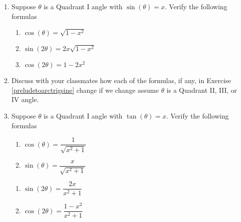 \documentclass{ximera}
\begin{document}
\begin{enumerate}

\setcounter{enumi}{\value{HW}}

\item  \label{preludetoarctrigsine} Suppose $\theta$ is a Quadrant I angle with $\sin(\theta) = x$. Verify the following formulas

\begin{multicols}{3}

\begin{enumerate}

\item  $\cos(\theta) = \sqrt{1-x^2}$

\item  $\sin(2\theta) = 2x\sqrt{1-x^2}$

\item $\cos(2\theta) = 1 - 2x^2$

\end{enumerate}

\end{multicols}

\item  Discuss with your classmates how each of the formulas, if any, in Exercise \ref{preludetoarctrigsine} change if we change assume $\theta$ is a Quadrant II, III, or IV angle.

\item  \label{preludetoarctrigtan} Suppose $\theta$ is a Quadrant I angle with $\tan(\theta) = x$. Verify the following formulas

\begin{multicols}{2}

\begin{enumerate}

\item $\cos(\theta) = \dfrac{1}{\sqrt{x^2+1}}$
\item $\sin(\theta) = \dfrac{x}{\sqrt{x^2+1}}$

\setcounter{HWindent}{\value{enumii}}

\end{enumerate}

\end{multicols}

\begin{multicols}{2}

\begin{enumerate}

\setcounter{enumii}{\value{HWindent}}

\item $\sin(2\theta) = \dfrac{2x}{x^2+1}$
\item $\cos(2\theta) = \dfrac{1-x^2}{x^2+1}$


\end{enumerate}
\end{multicols}
\end{enumerate}
\end{document}
